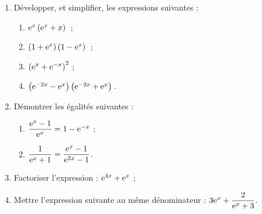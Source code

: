 \documentclass[a4paper,11pt]{article}
\begin{document}
\begin{enumerate}
	\item Développer, et simplifier, les expressions suivantes :
	\begin{multicols}{2}
		\newcommand\espv{\left( \e^x + \e^{-x} \right)^2}
		\begin{enumerate}
			\item $\e^x \left( \e^x + x \right)\vphantom{\espv}$ ;
			\item $\left( 1+\e^x \right)\left(1-\e^x\right)\vphantom{\espv}$ ;
			\item $\left( {\rm e}^x + {\rm e}^{-x} \right)^2$ ;
			\item $\left( \e^{-2x}-\e^x \right)\left( \e^{-2x}+\e^x \right)\vphantom{\espv}$.
		\end{enumerate}
	\end{multicols}
	\item Démontrer les égalités suivantes :
	\begin{multicols}{2}
		\begin{enumerate}
			\item $\dfrac{{\rm e}^x-1}{{\rm e}^x}=1-{\rm e}^{-x}$ ;
			\item $\dfrac{1}{{\rm e}^x+1}=\dfrac{{\rm e}^x-1}{{\rm e}^{2x}-1}$.
		\end{enumerate}
	\end{multicols}
	\item Factoriser l'expression : ${\rm e}^{4x}+{\rm e}^x$ ;
	\item Mettre l'expression suivante au même dénominateur : $3{\rm e}^x + \dfrac{2}{{\rm e}^x+3}$. 
\end{enumerate}

\medskip


\smallskip
\end{document}
